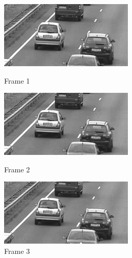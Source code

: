 \documentclass[12pt]{article}
\begin{document}
\begin{itemize}
\begin{enumerate}
    \begin{figure}[H]
        \centering
        \begin{minipage}{.45\textwidth}
            \centering
            \includegraphics[width=\linewidth]{results/cars_3_orig_1.png}
            \caption*{Frame 1}
        \end{minipage}
        \begin{minipage}{.45\textwidth}
            \centering
            \includegraphics[width=\linewidth]{results/cars_3_orig_2.png}
            \caption*{Frame 2}
        \end{minipage}
        \begin{minipage}{.45\textwidth}
            \centering
            \includegraphics[width=\linewidth]{results/cars_3_orig_3.png}
            \caption*{Frame 3}
        \end{minipage}
    \end{figure}
    


\end{enumerate}
\end{itemize}
\end{document}
